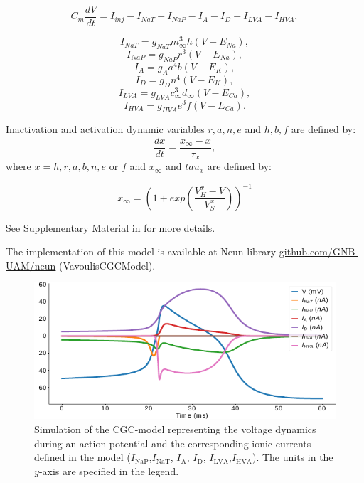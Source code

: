 \begin{equation}
C_m\frac{dV}{dt} = I_{inj} - I_{NaT} - I_{NaP} - I_{A} - I_{D} - I_{LVA} - I_{HVA},
\label{eq:voltage}
\end{equation}

\begin{equation}
I_{NaT} = g_{NaT} m_{{\infty}}^3 h (V - E_{Na}),
\end{equation}
\begin{equation}
I_{NaP} = g_{NaP} r^3 (V - E_{Na}),
\end{equation}
\begin{equation}
I_{A} = g_{A} a^4 b (V - E_{K}),
\end{equation}
\begin{equation}
I_{D} = g_{D} n^4 (V - E_{K}),
\end{equation}
\begin{equation}
I_{LVA} = g_{LVA} c_{{\infty}}^3 d_{{\infty}} (V - E_{Ca}),
\end{equation}
\begin{equation}
I_{HVA} = g_{HVA} e^3 f (V - E_{Ca}).
\label{eq:channels}
\end{equation}

Inactivation and activation dynamic variables $r,a,n,e$ and $h,b,f$ are defined by:
\begin{equation}
\frac{dx}{dt} = \frac{x_{\infty}-x}{\tau_x},
\end{equation}
where $x = h,r,a,b,n,e$ or $f$ and $x_{\infty}$ and $tau_x$ are defined by:

\begin{equation}
x_{\infty} = {(1+exp(\frac{V_H^x-V}{V_S^x}))}^{-1}
\end{equation}

See Supplementary Material in \textcite{vavoulis_balanced_2010} for more details. 

The implementation of this model is available at Neun library \href{https://github.com/GNB-UAM/neun}{github.com/GNB-UAM/neun} (VavoulisCGCModel).

\begin{figure}[htb!]
	\centering
	\includegraphics[width=\textwidth]{img/laser/cgc-model-simulation.pdf}
	\caption{Simulation of the CGC-model representing the voltage dynamics during an action potential and the corresponding ionic currents defined in the model ($I_{\textrm{NaP}}$,$I_{\textrm{NaT}}$, $I_{\textrm{A}}$, $I_{\textrm{D}}$, $I_{\textrm{LVA}}$,$I_{\textrm{HVA}}$). The units in the $y$-axis are specified in the legend.}
	\label{fig:model cgc currents}
\end{figure}


